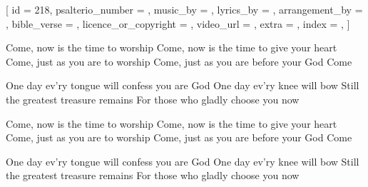 
[
    id = {218},
    psalterio_number = {},
    music_by = {},
    lyrics_by = {},
    arrangement_by = {},
    bible_verse = {},
    licence_or_copyright = {},
    video_url = {},
    extra = {},
    index = {},
]


\beginverse
Come, now is the time to worship
Come, now is the time to give your heart
Come, just as you are to worship
Come, just as you are before your God
Come
\endverse


\beginchorus
One day ev'ry tongue will confess you are God
One day ev'ry knee will bow
Still the greatest treasure remains
For those who gladly choose you now
\endchorus


\beginverse
Come, now is the time to worship
Come, now is the time to give your heart
Come, just as you are to worship
Come, just as you are before your God
Come
\endverse


\beginchorus
One day ev'ry tongue will confess you are God
One day ev'ry knee will bow
Still the greatest treasure remains
For those who gladly choose you now
\endchorus


\endsong
